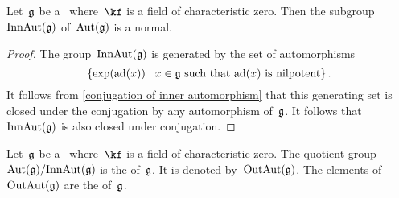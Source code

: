 \begin{proposition}
	Let~$\mathfrak{g}$ be a~\liealgebra{$\kf$} where~$\kf$ is a field of characteristic zero.
	Then the subgroup~$\operatorname{InnAut}(\mathfrak{g})$ of~$\operatorname{Aut}(\mathfrak{g})$ is a normal.
\end{proposition}


\begin{proof}
	The group~$\operatorname{InnAut}(\mathfrak{g})$ is generated by the set of automorphisms
	\[
		\{
			\exp(\ad(x))
		\suchthat
			\text{$x \in \glie$ such that~$\ad(x)$ is nilpotent}
		\} \,.
	\]
	It follows from \cref{conjugation of inner automorphism} that this generating set is closed under the conjugation by any automorphism of~$\mathfrak{g}$.
	It follows that~$\operatorname{InnAut}(\mathfrak{g})$ is also closed under conjugation.
\end{proof}


\begin{definition}
	Let~$\mathfrak{g}$ be a~\liealgebra{$\kf$} where~$\kf$ is a field of characteristic zero.
	The quotient group~$\operatorname{Aut}(\mathfrak{g}) / {\operatorname{InnAut}(\mathfrak{g})}$ is the  of~$\mathfrak{g}$.
	It is denoted by~$\operatorname{OutAut}(\mathfrak{g})$.
	The elements of~$\operatorname{OutAut}(\mathfrak{g})$ are the  of~$\mathfrak{g}$.
\end{definition}





